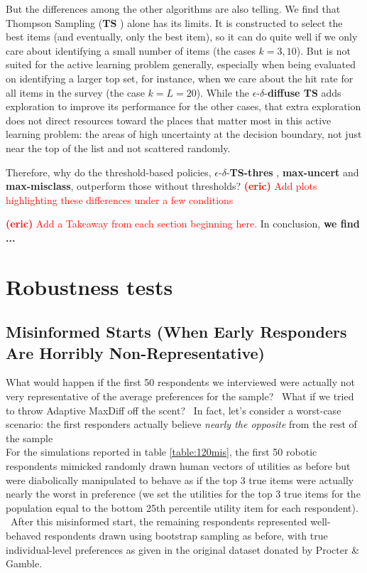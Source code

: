 \documentclass[nonblindrev]{informs3}
\newcommand{\eric}[1]{\textcolor{red}{\textbf{(eric)} #1}}
\newcommand{\mismin}{\textbf{max-misclass}}
\newcommand{\ts}{\textbf{TS} }
\newcommand{\edts}{$\epsilon$-$\delta$-\textbf{diffuse TS} }
\newcommand{\edtsthres}{$\epsilon$-$\delta$-\textbf{TS-thres} }
\newcommand{\uncert}{\textbf{max-uncert} }
\begin{document}
But the differences among the other algorithms are also telling. We find that Thompson Sampling (\ts) alone has its limits. It is constructed to select the best items (and eventually, only the best item), so it can do quite well if we only care about identifying a small number of items (the cases $k=3,10$). But is not suited for the active learning problem generally, especially when being evaluated on identifying a larger top set, for instance, when we care about the hit rate for all items in the survey (the case $k=L=20$). While the \edts adds exploration to improve its performance for the other cases, that extra exploration does not direct resources toward the places that matter most in this active learning problem: the areas of high uncertainty at the decision boundary, not just near the top of the list and not scattered randomly.  

Therefore, why do the threshold-based policies, \edtsthres, \uncert and \mismin, outperform those without thresholds? \eric{Add plots highlighting these differences under a few conditions}


\eric{Add a Takeaway from each section beginning here.} In conclusion, \textbf{we find ... }


\section{Robustness tests} \label{sec:robust}

\subsection{Misinformed Starts (When Early Responders Are Horribly Non-Representative)}

What would happen if the first 50 respondents we interviewed were actually not very representative of the average preferences for the sample?  What if we tried to throw Adaptive MaxDiff off the scent?  In fact, let's consider a worst-case scenario: the first responders actually believe \textit{nearly the opposite} from the rest of the sample\\
For the simulations reported in table \ref{table:120mis}, the first 50 robotic respondents mimicked randomly drawn human vectors of utilities as before but were diabolically manipulated to behave as if the top 3 true items were actually nearly the worst in preference (we set the utilities for the top 3 true items for the population equal to the bottom 25th percentile utility item for each respondent).  After this misinformed start, the remaining respondents represented well-behaved respondents drawn using bootstrap sampling as before, with true individual-level preferences as given in the original dataset donated by Procter \& Gamble.\\
\end{document}
